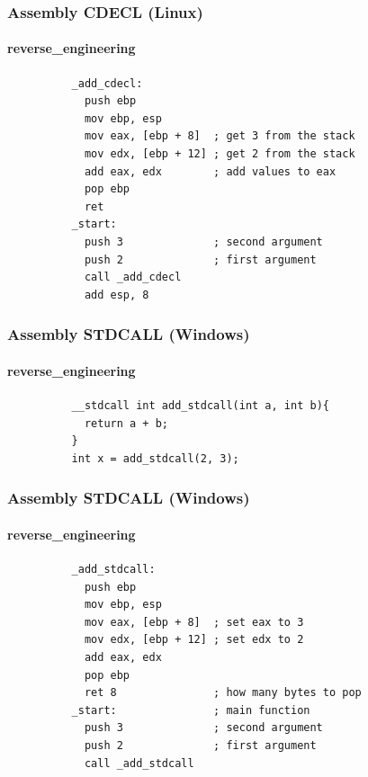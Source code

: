 \documentclass[aspectratio=169]{beamer}
\begin{document}
\begin{frame}[fragile]{}
  \frametitle{Assembly CDECL (Linux)}
  \framesubtitle{reverse\_engineering}
  \begin{center}
    \begin{tcolorbox}[title=cdecl.asm,colback=black]
        \begin{verbatim}
          _add_cdecl:
            push ebp
            mov ebp, esp
            mov eax, [ebp + 8]  ; get 3 from the stack
            mov edx, [ebp + 12] ; get 2 from the stack
            add eax, edx        ; add values to eax
            pop ebp
            ret
          _start:
            push 3              ; second argument 
            push 2              ; first argument
            call _add_cdecl
            add esp, 8
        \end{verbatim}
    \end{tcolorbox}
  \end{center}
\end{frame}

\begin{frame}[fragile]{}
  \frametitle{Assembly STDCALL (Windows)}
  \framesubtitle{reverse\_engineering}
  \begin{center}
    \begin{tcolorbox}[title=stdcall.c,colback=black]
        \begin{verbatim}
          __stdcall int add_stdcall(int a, int b){
            return a + b;
          }
          int x = add_stdcall(2, 3);
        \end{verbatim}
    \end{tcolorbox}
  \end{center}
\end{frame}

\begin{frame}[fragile]{}
  \frametitle{Assembly STDCALL (Windows)}
  \framesubtitle{reverse\_engineering}
  \begin{center}
    \begin{tcolorbox}[title=stdcall.asm,colback=black]
        \begin{verbatim}
          _add_stdcall:
            push ebp
            mov ebp, esp
            mov eax, [ebp + 8]  ; set eax to 3
            mov edx, [ebp + 12] ; set edx to 2
            add eax, edx
            pop ebp
            ret 8               ; how many bytes to pop
          _start:               ; main function
            push 3              ; second argument
            push 2              ; first argument
            call _add_stdcall
        \end{verbatim}
    \end{tcolorbox}
  \end{center}
\end{frame}
\end{document}
